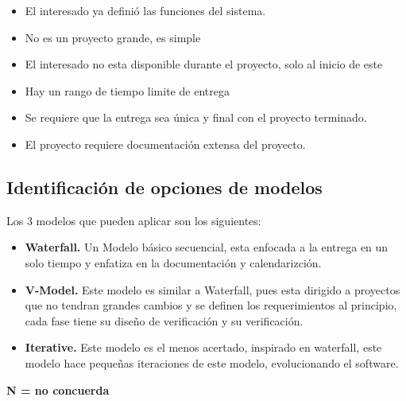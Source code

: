 \documentclass[spanish,12pt,letterpapper]{article}
\begin{document}
   \begin{itemize}
   \item El interesado ya definió las funciones del sistema.
   \item No es un proyecto grande, es simple
   \item El interesado no esta disponible durante el proyecto, solo al inicio de este
   \item Hay un rango de tiempo limite de entrega
   \item Se requiere que la entrega sea única y final con el proyecto terminado.
   \item El proyecto requiere documentación extensa del proyecto.
   \end{itemize}
   
   \subsection{Identificación de opciones de modelos}
   
   Los 3 modelos que pueden aplicar son los siguientes:
   
   \begin{itemize}
   \item \textbf{Waterfall.} Un Modelo básico secuencial, esta enfocada a la entrega en un solo tiempo y enfatiza en la documentación y calendarizción.
   \item \textbf{V-Model.} Este modelo es similar a Waterfall, pues esta dirigido a proyectos que no tendran grandes cambios y se definen los requerimientos al principio, cada fase tiene su diseño de verificación y su verificación.
   \item \textbf{Iterative.} Este modelo es el menos acertado, inspirado en waterfall, este modelo hace pequeñas iteraciones de este modelo, evolucionando el software.
   \end{itemize}
   
   \textbf{N = no concuerda}
   
\end{document}

